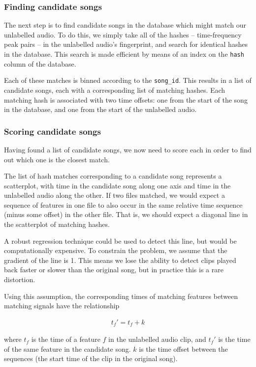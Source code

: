 \documentclass[12pt,a4paper,twoside,openright]{report}
\begin{document}
\subsubsection{Finding candidate songs}

The next step is to find candidate songs in the database which might match our unlabelled audio. To do this, we simply take all of the hashes -- time-frequency peak pairs -- in the unlabelled audio's fingerprint, and search for identical hashes in the database. This search is made efficient by means of an index on the \lstinline{hash} column of the database.

Each of these matches is binned according to the \lstinline{song_id}. This results in a list of candidate songs, each with a corresponding list of matching hashes. Each matching hash is associated with two time offsets: one  from the start of the song in the database, and one from the start of the unlabelled audio.

\subsubsection{Scoring candidate songs}

Having found a list of candidate songs, we now need to score each in order to find out which one is the closest match.

The list of hash matches corresponding to a candidate song represents a scatterplot, with time in the candidate song along one axis and time in the unlabelled audio along the other. If two files matched, we would expect a sequence of features in one file to also occur in the same relative time sequence (minus some offset) in the other file. That is, we should expect a diagonal line in the scatterplot of matching hashes.

A robust regression technique could be used to detect this line, but would be computationally expensive. To constrain the problem, we assume that the gradient of the line is 1. This means we lose the ability to detect clips played back faster or slower than the original song, but in practice this is a rare distortion.

Using this assumption, the corresponding times of matching features between matching signals have the relationship

\begin{align*}
  t_f' = t_f + k 
\end{align*}

where $t_f$ is the time of a feature $f$ in the unlabelled audio clip, and $t_f'$ is the time of the same feature in the candidate song. $k$ is the time offset between the sequences (the start time of the clip in the original song).
\end{document}
